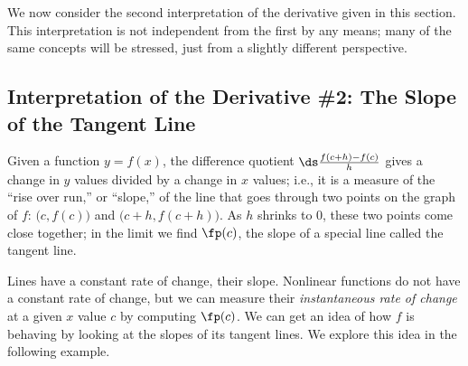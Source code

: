We now consider the second interpretation of the derivative given in this section. This interpretation is not independent from the first by any means; many of the same concepts will be stressed, just from a slightly different perspective.

\subsection{Interpretation of the Derivative \#2: The Slope of the Tangent Line}

Given a function $y=f(x)$, the difference quotient $\ds \frac{f(c+h)-f(c)}{h}$ gives a change in $y$ values divided by a change in $x$ values; i.e., it is a measure of the ``rise over run,'' or ``slope,'' of the line that goes through two points on the graph of $f$: $\big(c, f(c)\big)$ and $\big(c+h,f(c+h)\big)$. As $h$ shrinks to 0, these two points come close together; in the limit we find $\fp(c)$, the slope of a special line called the tangent line. %

Lines have a constant rate of change, their slope. Nonlinear functions do not have a constant rate of change, but we can measure their \textit{instantaneous rate of change} at a given $x$ value $c$ by computing $\fp(c)$. We can get an idea of how $f$ is behaving by looking at the slopes of its tangent lines. We explore this idea in the following example.



